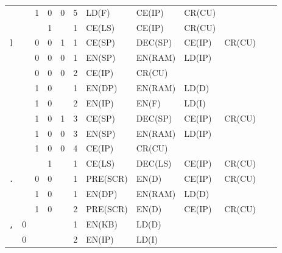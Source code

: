 \begin{landscape}
\begin{longtable}[c] {c|cccc|c|llllll}
    \rowcolor{White}
               &   & 1 & 0     & 0    & 5     & LD(F)   & CE(IP) & CR(CU)  &        &        &        \\ 
    \rowcolor{Gray}
               &   &   & 1     &      & 1     & CE(LS)  & CE(IP) & CR(CU)  &        &        &        \\ \hline
    \rowcolor{White}
    \texttt{]} &   & 0 & 0     & 1    & 1     & CE(SP)  & DEC(SP)& CE(IP)  & CR(CU) &        &        \\
    \rowcolor{Gray}
               &   & 0 & 0     & 0    & 1     & EN(SP)  & EN(RAM)& LD(IP)  &        &        &        \\
    \rowcolor{Gray}
               &   & 0 & 0     & 0    & 2     & CE(IP)  & CR(CU) &         &        &        &        \\
    \rowcolor{White}
               &   & 1 & 0     &      & 1     & EN(DP)  & EN(RAM) & LD(D)  &        &        &        \\
    \rowcolor{White}
               &   & 1 & 0     &      & 2     & EN(IP)  & EN(F)   & LD(I)  &        &        &        \\
    \rowcolor{White}
               &   & 1 & 0     & 1    & 3     & CE(SP)  & DEC(SP) & CE(IP) & CR(CU) &        &        \\
    \rowcolor{Gray}
               &   & 1 & 0     & 0    & 3     & EN(SP)  & EN(RAM) & LD(IP) &        &        &        \\
    \rowcolor{Gray}
               &   & 1 & 0     & 0    & 4     & CE(IP)  & CR(CU)  &        &        &        &        \\
    \rowcolor{White}
               &   &   & 1     &      & 1     & CE(LS)  & DEC(LS) & CE(IP) & CR(CU) &        &        \\ \hline
    \rowcolor{Gray}
    \texttt{.} &   & 0 & 0     &      & 1     & PRE(SCR)& EN(D)   & CE(IP) & CR(CU) &        &        \\
    \rowcolor{White}
               &   & 1 & 0     &      & 1     & EN(DP)  & EN(RAM) & LD(D)  &        &        &        \\
    \rowcolor{White}
               &   & 1 & 0     &      & 2     & PRE(SCR)& EN(D)   & CE(IP) & CR(CU) &        &        \\ \hline
    \rowcolor{Gray}
    \texttt{,} & 0 &   &       &      & 1     & EN(KB)  & LD(D)   &        &        &        &        \\
    \rowcolor{Gray}
               & 0 &   &       &      & 2     & EN(IP)  & LD(I)   &        &        &        &        \\

\end{longtable}
\end{landscape}
